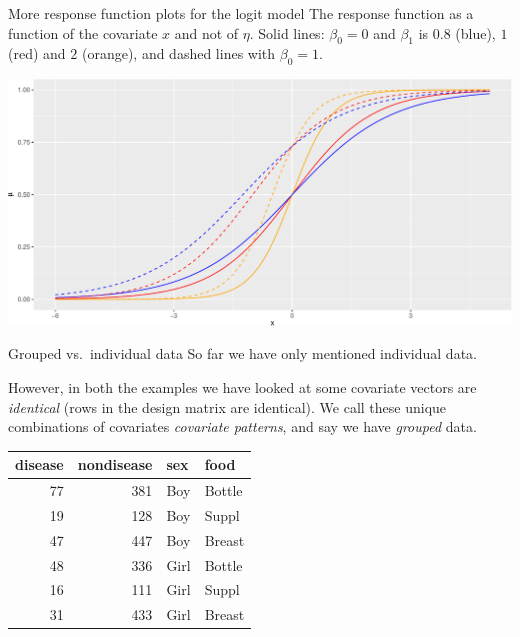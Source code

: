 \documentclass[
  ignorenonframetext,
]{beamer}
\begin{document}
\begin{frame}
\begin{block}{More response function plots for the logit model}
\protect\hypertarget{more-response-function-plots-for-the-logit-model}{}
The response function as a function of the covariate \(x\) and not of
\(\eta\). Solid lines: \(\beta_0=0\) and \(\beta_1\) is \(0.8\) (blue),
\(1\) (red) and \(2\) (orange), and dashed lines with \(\beta_0=1\).

\includegraphics{Module03PresentationWeek1_files/figure-beamer/unnamed-chunk-10-1.pdf}
\end{block}
\end{frame}

\begin{frame}{Grouped vs.~individual data}
\protect\hypertarget{grouped-vs.-individual-data}{}
So far we have only mentioned individual data.

However, in both the examples we have looked at some covariate vectors
are \emph{identical} (rows in the design matrix are identical). We call
these unique combinations of covariates \emph{covariate patterns}, and
say we have \emph{grouped} data.

\begin{table}
\centering
\begin{tabular}{r|r|l|l}
\hline
disease & nondisease & sex & food\\
\hline
77 & 381 & Boy & Bottle\\
\hline
19 & 128 & Boy & Suppl\\
\hline
47 & 447 & Boy & Breast\\
\hline
48 & 336 & Girl & Bottle\\
\hline
16 & 111 & Girl & Suppl\\
\hline
31 & 433 & Girl & Breast\\
\hline
\end{tabular}
\end{table}
\end{frame}
\end{document}
